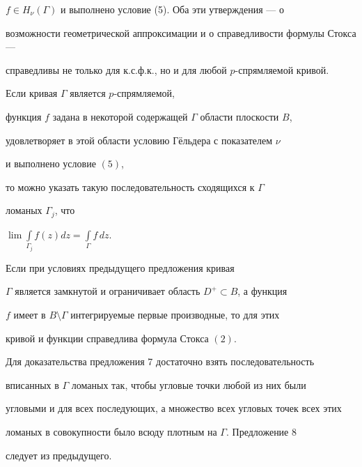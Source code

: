 $f\in H_{\nu}(\Gamma)$ и выполнено условие (5). Оба эти утверждения --- о


возможности геометрической аппроксимации и о справедливости формулы Стокса ---


справедливы не только для к.с.ф.к., но и для любой $p$-спрямляемой кривой.





\begin{prop}


Если кривая $\Gamma$ является $p$-спрямляемой,


функция $f$ задана в некоторой содержащей $\Gamma$ области плоскости $B$,


удовлетворяет в этой области условию Г\"ельдера с показателем $\nu$


и выполнено условие $(5)$,


то можно указать такую последовательность сходящихся к $\Gamma$


ломаных $\Gamma_j$, что


$\lim\int\limits_{\Gamma_j}{f(z)dz} = \int\limits_{\Gamma}{f\,dz}$.


\end{prop}





\begin{prop}


Если при условиях предыдущего предложения кривая


$\Gamma$ является замкнутой и ограничивает область $D^+ \subset B$, а функция


$f$ имеет в $B\setminus\Gamma$ интегрируемые первые производные, то для этих


кривой и функции справедлива формула Стокса $(2)$.


\end{prop}





Для доказательства предложения 7 достаточно взять последовательность


вписанных в $\Gamma$ ломаных так, чтобы угловые точки любой из них были


угловыми и для всех последующих, а множество всех угловых точек всех этих


ломаных в совокупности было всюду плотным на $\Gamma$. Предложение 8


следует из предыдущего.





